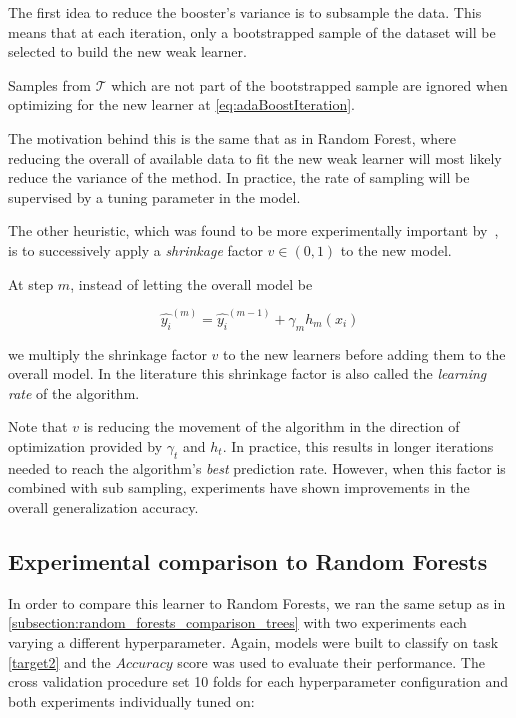 The first idea to reduce the booster's variance is to subsample the data.
This means that at each iteration, only a bootstrapped sample of the dataset will be selected to build the new weak learner.

Samples from $\mathcal{T}$ which are not part of the bootstrapped sample are ignored when optimizing for the new learner at \cref{eq:adaBoostIteration}.

The motivation behind this is the same that as in Random Forest, where reducing the overall of available data to fit the new weak learner will most likely reduce the variance of the method.
In practice, the rate of sampling will be supervised by a tuning parameter in the model.

The other heuristic, which was found to be more experimentally important by~\citep{hastie-elemstatslearn}, is to successively apply a \textit{shrinkage} factor $v \in (0,1)$ to the new model.

At step $m$, instead of letting the overall model be

\begin{equation}
\hat{y_i}^{(m)} = \hat{y_i}^{(m-1)} + \gamma_m h_m(x_i)
\end{equation}

 we multiply the shrinkage factor $v$ to the new learners before adding them to the overall model.
In the literature this shrinkage factor is also called the \textit{learning rate} of the algorithm.

Note that $v$ is reducing the movement of the algorithm in the direction of optimization provided by $\gamma_t$ and $h_t$.
In practice, this results in longer iterations needed to reach the algorithm's \textit{best} prediction rate.
However, when this factor is combined with sub sampling, experiments have shown improvements in the overall generalization accuracy.


\subsection{ Experimental comparison to Random Forests}\label{subsection:boosting_comparison_forest}

In order to compare this learner to Random Forests, we ran the same setup as in \cref{subsection:random_forests_comparison_trees}
with two experiments each varying a different hyperparameter.
Again, models were built to classify on task \cref{target2} and the $Accuracy$ score was used to evaluate their performance.
The cross validation procedure set 10 folds for each hyperparameter configuration and both experiments individually tuned on:

